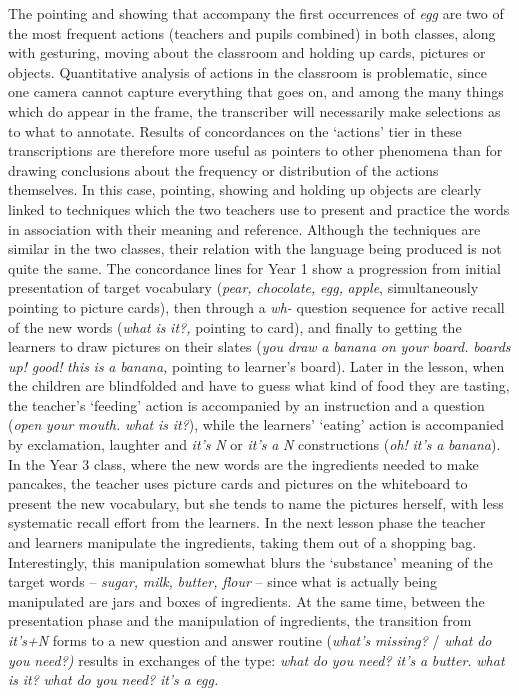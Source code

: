 \documentclass[output=paper,colorlinks,citecolor=brown,modfonts,nonflat]{../langscibook}
\begin{document}
The pointing and showing that accompany the first occurrences of \textit{egg} are two of the most frequent actions (teachers and pupils combined) in both classes, along with gesturing, moving about the classroom and holding up cards, pictures or objects. Quantitative analysis of actions in the classroom is problematic, since one camera cannot capture everything that goes on, and among the many things which do appear in the frame, the transcriber will necessarily make selections as to what to annotate. Results of concordances on the ‘actions’ tier in these transcriptions are therefore more useful as pointers to other phenomena than for drawing conclusions about the frequency or distribution of the actions themselves. In this case, pointing, showing and holding up objects are clearly linked to techniques which the two teachers use to present and practice the words in association with their meaning and reference. Although the techniques are similar in the two classes, their relation with the language being produced is not quite the same. The concordance lines for Year 1 show a progression from initial presentation of target vocabulary (\textit{pear,} \textit{chocolate,} \textit{egg,} \textit{apple}, simultaneously pointing to picture cards), then through a \textit{wh-} question sequence for active recall of the new words (\textit{what} \textit{is} \textit{it?,} pointing to card), and finally to getting the learners to draw pictures on their slates (\textit{you} \textit{draw} \textit{a} \textit{banana} \textit{on} \textit{your} \textit{board.} \textit{boards} \textit{up!} \textit{good!} \textit{this} \textit{is} \textit{a} \textit{banana,} pointing to learner’s board). Later in the lesson, when the children are blindfolded and have to guess what kind of food they are tasting, the teacher’s ‘feeding’ action is accompanied by an instruction and a question (\textit{open} \textit{your} \textit{mouth.} \textit{what} \textit{is} \textit{it?}), while the learners’ ‘eating’ action is accompanied by exclamation, laughter and \textit{it’s} \textit{N} or \textit{it’s} \textit{a} \textit{N} constructions (\textit{oh!} \textit{it’s} \textit{a} \textit{banana}). In the Year 3 class, where the new words are the ingredients needed to make pancakes, the teacher uses picture cards and pictures on the whiteboard to present the new vocabulary, but she tends to name the pictures herself, with less systematic recall effort from the learners. In the next lesson phase the teacher and learners manipulate the ingredients, taking them out of a shopping bag. Interestingly, this manipulation somewhat blurs the ‘substance’ meaning of the target words – \textit{sugar,} \textit{milk,} \textit{butter,} \textit{flour} – since what is actually being manipulated are jars and boxes of ingredients. At the same time, between the presentation phase and the manipulation of ingredients, the transition from \textit{it’s+N} forms to a new question and answer routine (\textit{what’s} \textit{missing?} / \textit{what} \textit{do} \textit{you} \textit{need?)} results in exchanges of the type: \textit{what} \textit{do} \textit{you} \textit{need?} \textit{it’s} \textit{a} \textit{butter.} \textit{what} \textit{is} \textit{it?} \textit{what} \textit{do} \textit{you} \textit{need?} \textit{it’s} \textit{a} \textit{egg.} 
\end{document}
